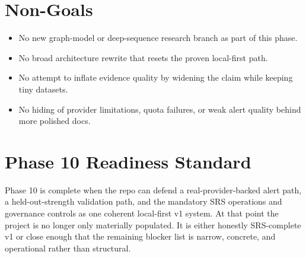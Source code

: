 \documentclass{article}
\begin{document}
\section*{Non-Goals}
\begin{itemize}
\item No new graph-model or deep-sequence research branch as part of this phase.
\item No broad architecture rewrite that resets the proven local-first path.
\item No attempt to inflate evidence quality by widening the claim while keeping tiny datasets.
\item No hiding of provider limitations, quota failures, or weak alert quality behind more polished docs.
\end{itemize}

\section*{Phase 10 Readiness Standard}
Phase 10 is complete when the repo can defend a real-provider-backed alert path, a held-out-strength validation path, and the mandatory SRS operations and governance controls as one coherent local-first v1 system. At that point the project is no longer only materially populated. It is either honestly SRS-complete v1 or close enough that the remaining blocker list is narrow, concrete, and operational rather than structural.
\end{document}
